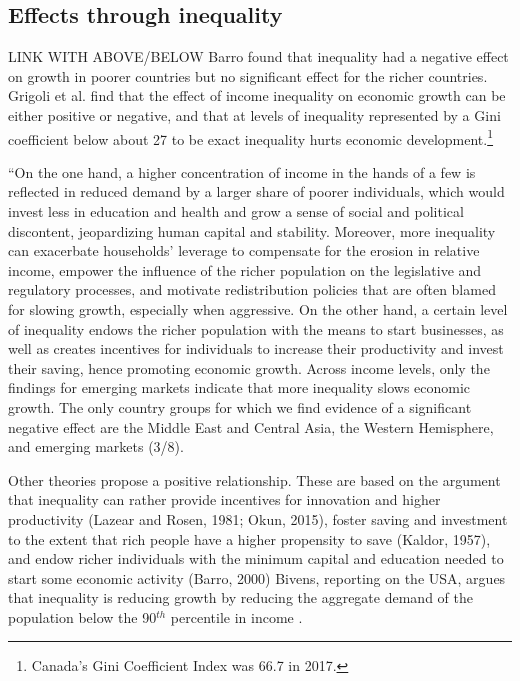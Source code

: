 \subsection{Effects through inequality}
LINK WITH ABOVE/BELOW
Barro \cite{barroInequalityGrowthInvestment1999} found that inequality had a negative effect on growth in poorer countries but no significant effect for the richer countries. Grigoli et al. \cite{grigoliInequalityGrowthHeterogeneous2016} find  that the effect of income inequality on economic growth can be either positive or negative, and that at levels  of inequality  represented by a Gini coefficient below about 27  to be exact inequality hurts economic development.\footnote{Canada's Gini Coefficient Index was 66.7 in 2017. } %

 ``On the one hand, a higher concentration of income in the hands of a few is reflected in reduced demand by a larger share of poorer individuals, which would invest less in education and health and grow a sense of social and political discontent, jeopardizing human capital and stability. Moreover, more inequality can exacerbate households' leverage to compensate for the erosion in relative income, empower the influence of the richer population on the legislative and regulatory processes, and motivate redistribution policies that are often blamed for slowing growth, especially when aggressive. On the other hand, a certain level of inequality endows the richer population with the means to start businesses, as well as creates incentives for individuals to increase their productivity and invest their saving, hence promoting economic growth. Across income levels, only the findings for emerging markets indicate that more inequality slows economic growth. The only country groups for which we find evidence of a significant negative effect are the Middle East and Central Asia, the Western Hemisphere, and emerging markets (3/8).

 
 Other theories propose a positive relationship. These are based on the argument that inequality can rather provide incentives for innovation and higher productivity (Lazear and Rosen, 1981; Okun, 2015), foster saving and investment to the extent that rich people have a higher propensity to save (Kaldor, 1957), and endow richer individuals with the minimum capital and education needed to start some economic activity (Barro, 2000)
Bivens, reporting on the USA, argues that inequality is reducing growth by reducing the aggregate demand of the population below the 90$^{th}$ percentile in income \cite{bivensInequalitySlowingUS2017}.



